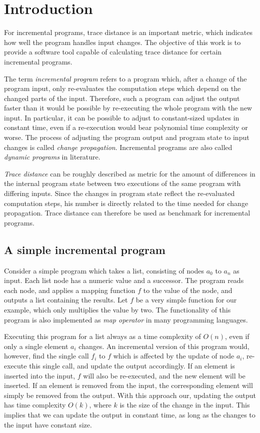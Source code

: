 
\chapter{Introduction}
\label{ch:Introduction}

For incremental programs, trace distance is an important metric, which indicates how well the program handles input changes. The objective of this work is to provide a software tool capable of calculating trace distance for certain incremental programs.  

The term \textit{incremental program} refers to a program which, after a change of the program input, only re-evaluates the computation steps which depend on the changed parts of the input. Therefore, such a program can adjust the output faster than it would be possible by re-executing the whole program with the new input. In particular, it can be possible to adjust to constant-sized updates in constant time, even if a re-execution would bear polynomial time complexity or worse. The process of adjusting the program output and program state to input changes is called \textit{change propagation}. Incremental programs are also called \textit{dynamic programs} in literature. 

\textit{Trace distance} can be roughly described as metric for the amount of differences in the internal program state between two executions of the same program with differing inputs. Since the changes in program state reflect the re-evaluated computation steps, his number is directly related to the time needed for change propagation. Trace distance can therefore be used as benchmark for incremental programs. 

\section{A simple incremental program}
\label{sec:simple_example}
Consider a simple program which takes a list, consisting of nodes $a_0$ to $a_n$ as input. Each list node has a numeric value and a successor. The program reads each node, and applies a mapping function $f$ to the value of the node, and outputs a list containing the results. Let $f$ be a very simple function for our example, which only multiplies the value by two. The functionality of this program is also implemented as \textit{map operator} in many programming languages. 

Executing this program for a list always as a time complexity of $O(n)$, even if only a single element $a_i$ changes. An incremental version of this program would, however, find the single call $f_i$ to $f$ which is affected by the update of node $a_i$, re-execute this single call, and update the output accordingly. If an element is inserted into the input, $f$ will also be re-executed, and the new element will be inserted. If an element is removed from the input, the corresponding element will simply be removed from the output. With this approach our, updating the output has time complexity $O(k)$, where $k$ is the size of the change in the input. This implies that we can update the output in constant time, as long as the changes to the input have constant size. 

